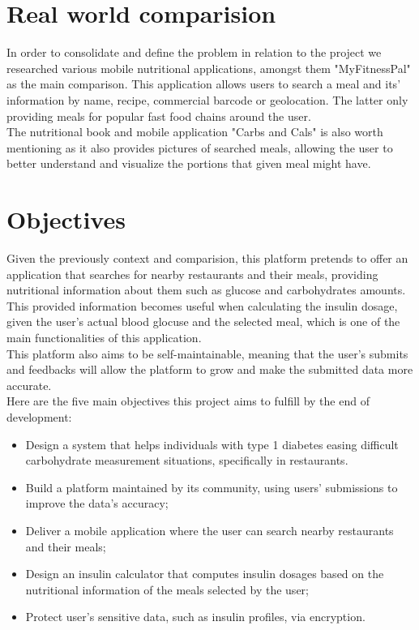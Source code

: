 \newpage
\section{Real world comparision}

In order to consolidate and define the problem in relation to the project we
researched various mobile nutritional applications, amongst them "MyFitnessPal" as the main comparison.
This application allows users to search a meal and its' information by name, recipe, commercial barcode or geolocation. The latter
only providing meals for popular fast food chains around the user.\\

The nutritional book and mobile application "Carbs and Cals" is also worth mentioning as it also provides pictures 
of searched meals, allowing the user to better understand and visualize the portions that given meal might have.

\section{Objectives}

Given the previously context and comparision, this platform pretends to offer an application that searches for 
nearby restaurants and their meals, providing nutritional information about them such as glucose and carbohydrates amounts.
This provided information becomes useful when calculating the insulin dosage, given the user's actual blood glocuse 
and the selected meal, which is one of the main functionalities of this application.\\

This platform also aims to be self-maintainable, meaning that the user's submits and feedbacks will allow the platform to grow
and make the submitted data more accurate.\\ 

Here are the five main objectives this project aims to fulfill by the end of development:\\

\begin{itemize}
    \item Design a system that helps individuals with type 1 diabetes easing difficult carbohydrate measurement situations, specifically in restaurants.
    \item Build a platform maintained by its community, using users' submissions to improve the data's accuracy;
    \item Deliver a mobile application where the user can search nearby restaurants and their meals;
    \item Design an insulin calculator that computes insulin dosages based on the nutritional information of the meals selected by the user;
    \item Protect user's sensitive data, such as insulin profiles, via encryption.
\end{itemize}